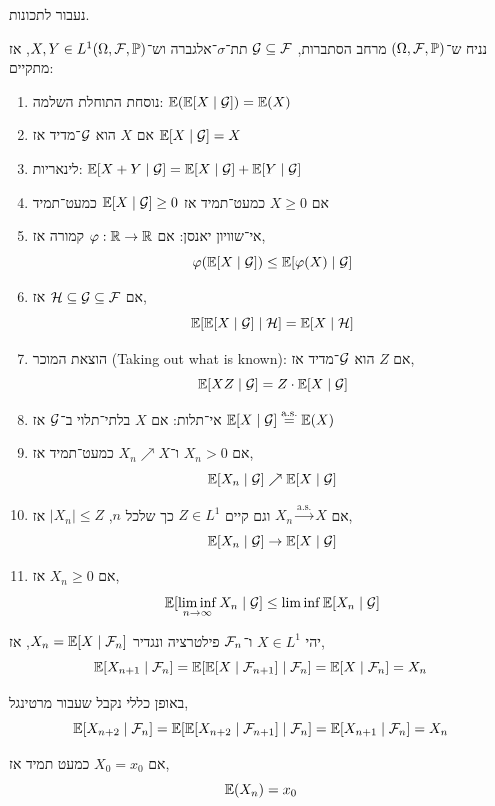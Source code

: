 נעבור לתכונות.
\begin{proposition}
	נניח ש־$(\Omega, \mathcal{F}, \mathbb{P})$ מרחב הסתברות, $\mathcal{G} \subseteq \mathcal{F}$ תת־$\sigma$־אלגברה וש־$X, Y \in L^1(\Omega, \mathcal{F}, \mathbb{P})$, אז מתקיים:
	\begin{enumerate}
		\item נוסחת התוחלת השלמה: $\mathbb{E}(\mathbb{E}[X \mid \mathcal{G}]) = \mathbb{E}(X)$
		\item אם $X$ הוא $\mathcal{G}$־מדיד אז $\mathbb{E}[X \mid \mathcal{G}] = X$
		\item לינאריות:
			$\mathbb{E}[X + Y \mid \mathcal{G}] = \mathbb{E}[X \mid \mathcal{G}] + \mathbb{E}[Y \mid \mathcal{G}]$
		\item אם $X \ge 0$ כמעט־תמיד אז $\mathbb{E}[X \mid \mathcal{G}] \ge 0$ כמעט־תמיד
		\item אי־שוויון יאנסן:
			אם $\varphi : \mathbb{R} \to \mathbb{R}$ קמורה אז,
			\[
				\varphi(\mathbb{E}[X \mid \mathcal{G}])
				\le \mathbb{E}[\varphi(X) \mid \mathcal{G}]
			\]
		\item אם $\mathcal{H} \subseteq \mathcal{G} \subseteq \mathcal{F}$ אז,
			\[
				\mathbb{E}[\mathbb{E}[X \mid \mathcal{G}] \mid \mathcal{H}]
				= \mathbb{E}[X \mid \mathcal{H}]
			\]
		\item הוצאת המוכר (Taking out what is known):
			אם $Z$ הוא $\mathcal{G}$־מדיד אז,
			\[
				\mathbb{E}[X Z \mid \mathcal{G}]
				= Z \cdot \mathbb{E}[X \mid \mathcal{G}]
			\]
		\item אי־תלות:
			אם $X$ בלתי־תלוי ב־$\mathcal{G}$ אז $\mathbb{E}[X \mid \mathcal{G}] \overset{\text{a.s.}}{=} \mathbb{E}(X)$
		\item אם $X_n > 0$ ו־$X_n \nearrow X$ כמעט־תמיד אז,
			\[
				\mathbb{E}[X_n \mid \mathcal{G}]
				\nearrow \mathbb{E}[X \mid \mathcal{G}]
			\]
		\item אם $X_n \overset{\text{a.s.}}{\to} X$ וגם קיים $Z \in L^1$ כך שלכל $n$, $|X_n| \le Z$ אז,
			\[
				\mathbb{E}[X_n \mid \mathcal{G}]
				\to \mathbb{E}[X \mid \mathcal{G}]
			\]
		\item אם $X_n \ge 0$ אז,
			\[
				\mathbb{E}[\liminf_{n \to \infty} X_n \mid \mathcal{G}]
				\le \liminf \mathbb{E}[X_n \mid \mathcal{G}]
			\]
	\end{enumerate}
\end{proposition}
\begin{example}
	יהי $X \in L^1$ ו־$\mathcal{F}_n$ פילטרציה ונגדיר $X_n = \mathbb{E}[X \mid \mathcal{F}_n]$, אז,
	\[
		\mathbb{E}[X_{n + 1} \mid \mathcal{F}_n]
		= \mathbb{E}[\mathbb{E}[X \mid \mathcal{F}_{n + 1}] \mid \mathcal{F}_n]
		= \mathbb{E}[X \mid \mathcal{F}_n]
		= X_n
	\]
\end{example}
באופן כללי נקבל שעבור מרטינגל,
\[
	\mathbb{E}[X_{n + 2} \mid \mathcal{F}_n]
	= \mathbb{E}[\mathbb{E}[X_{n + 2} \mid \mathcal{F}_{n + 1}] \mid \mathcal{F}_n]
	= \mathbb{E}[X_{n + 1} \mid \mathcal{F}_n]
	= X_n
\]
\begin{corollary}
	אם $X_0 = x_0$ כמעט תמיד אז,
	\[
		\mathbb{E}(X_n)
		= x_0
	\]
\end{corollary}


